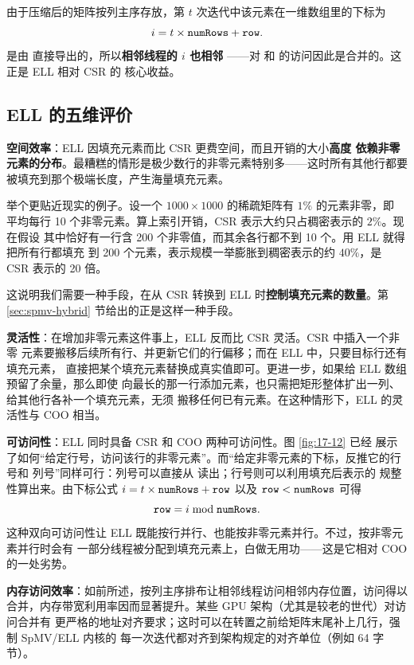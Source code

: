 由于压缩后的矩阵按列主序存放，第 $t$ 次迭代中该元素在一维数组里的下标为
\[
  i = t\times\code{numRows} + \code{row}.
\]
 是由  直接导出的，所以\textbf{相邻线程的 $i$ 也相邻}
——对  和  的访问因此是合并的。这正是 ELL 相对 CSR 的
核心收益。

\subsection*{ELL 的五维评价}

\textbf{空间效率}：ELL 因填充元素而比 CSR 更费空间，而且开销的大小\textbf{高度
依赖非零元素的分布}。最糟糕的情形是极少数行的非零元素特别多——这时所有其他行都要
被填充到那个极端长度，产生海量填充元素。

举个更贴近现实的例子。设一个 $1000\times1000$ 的稀疏矩阵有 $1\%$ 的元素非零，即
平均每行 10 个非零元素。算上索引开销，CSR 表示大约只占稠密表示的 $2\%$。现在假设
其中恰好有一行含 200 个非零值，而其余各行都不到 10 个。用 ELL 就得把所有行都填充
到 200 个元素，表示规模一举膨胀到稠密表示的约 $40\%$，是 CSR 表示的 20 倍。

这说明我们需要一种手段，在从 CSR 转换到 ELL 时\textbf{控制填充元素的数量}。第
\ref{sec:spmv-hybrid} 节给出的正是这样一种手段。

\textbf{灵活性}：在增加非零元素这件事上，ELL 反而比 CSR 灵活。CSR 中插入一个非零
元素要搬移后续所有行、并更新它们的行偏移；而在 ELL 中，只要目标行还有填充元素，
直接把某个填充元素替换成真实值即可。更进一步，如果给 ELL 数组预留了余量，那么即使
向最长的那一行添加元素，也只需把矩形整体扩出一列、给其他行各补一个填充元素，无须
搬移任何已有元素。在这种情形下，ELL 的灵活性与 COO 相当。

\textbf{可访问性}：ELL 同时具备 CSR 和 COO 两种可访问性。图 \ref{fig:17-12} 已经
展示了如何“给定行号，访问该行的非零元素”。而“给定非零元素的下标，反推它的行号和
列号”同样可行：列号可以直接从  读出；行号则可以利用填充后表示的
规整性算出来。由下标公式 $i = t\times\code{numRows} + \code{row}$ 以及
$\code{row} < \code{numRows}$ 可得
\[
  \code{row} = i \bmod \code{numRows}.
\]
这种双向可访问性让 ELL 既能按行并行、也能按非零元素并行。不过，按非零元素并行时会有
一部分线程被分配到填充元素上，白做无用功——这是它相对 COO 的一处劣势。

\textbf{内存访问效率}：如前所述，按列主序排布让相邻线程访问相邻内存位置，访问得以
合并，内存带宽利用率因而显著提升。某些 GPU 架构（尤其是较老的世代）对访问合并有
更严格的地址对齐要求；这时可以在转置之前给矩阵末尾补上几行，强制 SpMV/ELL 内核的
每一次迭代都对齐到架构规定的对齐单位（例如 64 字节）。

